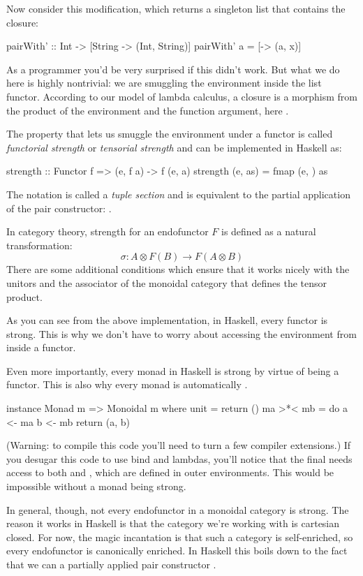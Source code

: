\documentclass[DaoFP]{subfiles}
\begin{document}
Now consider this modification, which returns a singleton list that contains the closure:
\begin{haskell}
pairWith' :: Int -> [String -> (Int, String)]
pairWith' a = [\x -> (a, x)]
\end{haskell}
As a programmer you'd be very surprised if this didn't work. But what we do here is highly nontrivial: we are smuggling the environment inside the list functor. According to our model of lambda calculus, a closure is a morphism from the product of the environment and the function argument, here . 

The property that lets us smuggle the environment under a functor is called \emph{functorial strength} or \emph{tensorial strength} and can be implemented in Haskell as:
\begin{haskell}
strength :: Functor f => (e, f a) -> f (e, a)
strength (e, as) = fmap (e, ) as
\end{haskell}
The notation  is called a \emph{tuple section} and is equivalent to the partial application of the pair constructor: .

In category theory, strength for an endofunctor $F$ is defined as a natural transformation:
\[ \sigma \colon A \otimes F(B) \to F (A \otimes B) \]
There are some additional conditions which ensure that it works nicely with the unitors and the associator of the monoidal category that defines the tensor product.

As you can see from the above implementation, in Haskell, every functor is strong. This is why we don't have to worry about accessing the environment from inside a functor. 

Even more importantly, every monad in Haskell is strong by virtue of being a functor. This is also why every monad is automatically . 
\begin{haskell}
instance Monad m => Monoidal m where
  unit = return ()
  ma >*< mb = do
    a <- ma
    b <- mb
    return (a, b)
\end{haskell}
(Warning: to compile this code you'll need to turn a few compiler extensions.) If you desugar this code to use bind and lambdas, you'll notice that the final  needs access to both  and , which are defined in outer environments. This would be impossible without a monad being strong.

In general, though, not every endofunctor in a monoidal category is strong. The reason it works in Haskell is that the category we're working with is cartesian closed. For now, the magic incantation is that such a category is self-enriched, so every endofunctor is canonically enriched. In Haskell this boils down to the fact that we can  a partially applied pair constructor .
\end{document}
